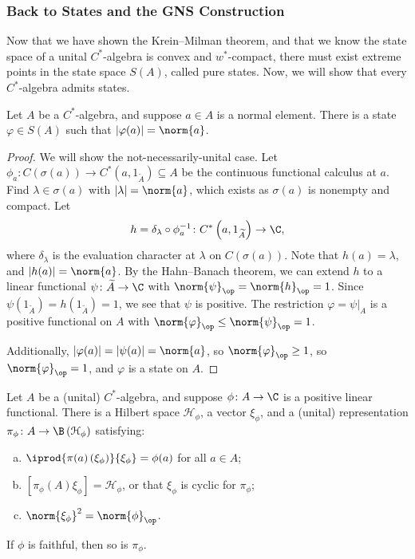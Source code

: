 \documentclass[10pt]{mypackage}
\begin{document}
\subsubsection{Back to States and the GNS Construction}%
Now that we have shown the Krein--Milman theorem, and that we know the state space of a unital $C^{\ast}$-algebra is convex and $w^{\ast}$-compact, there must exist extreme points in the state space $S(A)$, called pure states. Now, we will show that every $C^{\ast}$-algebra admits states.
\begin{proposition}
  Let $A$ be a $C^{\ast}$-algebra, and suppose $a\in A$ is a normal element. There is a state $\varphi\in S(A)$ such that $\left\vert \varphi(a) \right\vert = \norm{a}$.
\end{proposition}
\begin{proof}
  We will show the not-necessarily-unital case. Let $\phi_a\colon C\left(\sigma\left(a\right)\right)\rightarrow C^{\ast}\left(a,1_{\widetilde{A}}\right)\subseteq A$ be the continuous functional calculus at $a$. Find $\lambda\in \sigma(a)$ with $\left\vert \lambda \right\vert = \norm{a}$, which exists as $\sigma(a)$ is nonempty and compact. Let
  \begin{align*}
    h = \delta_{\lambda}\circ \phi_a^{-1}\colon C^{\ast}\left(a,1_{\widetilde{A}}\right) \rightarrow \C,
  \end{align*}
  where $\delta_{\lambda}$ is the evaluation character at $\lambda$ on $C\left(\sigma\left(a\right)\right)$. Note that $h(a) = \lambda$, and $\left\vert h(a) \right\vert = \norm{a}$. By the Hahn--Banach theorem, we can extend $h$ to a linear functional $\psi\colon \widetilde{A}\rightarrow \C$ with $\norm{\psi}_{\op} = \norm{h}_{\op} = 1$. Since $\psi\left(1_{\widetilde{A}}\right) = h\left(1_{\widetilde{A}}\right) = 1$, we see that $\psi$ is positive. The restriction $\varphi = \psi|_{A}$ is a positive functional on $A$ with $\norm{\varphi}_{\op} \leq \norm{\psi}_{\op} = 1$.\newline

  Additionally, $\left\vert \varphi(a) \right\vert = \left\vert \psi(a) \right\vert = \norm{a}$, so $\norm{\varphi}_{\op}\geq 1$, so $\norm{\varphi}_{\op} = 1$, and $\varphi$ is a state on $A$.
\end{proof}
\begin{theorem}
  Let $A$ be a (unital) $C^{\ast}$-algebra, and suppose $\phi\colon A\rightarrow \C$ is a positive linear functional. There is a Hilbert space $\mathcal{H}_{\phi}$, a vector $\xi_{\phi}$, and a (unital) representation $\pi_{\phi}\colon A\rightarrow \B\left(\mathcal{H}_{\phi}\right)$ satisfying:
  \begin{enumerate}[(a)]
    \item $ \iprod{\pi(a)\left(\xi_{\phi}\right)}{\xi_{\phi}} = \phi(a) $ for all $a\in A$;
    \item $\left[\pi_{\phi}(A)\xi_{\phi}\right] = \mathcal{H}_{\phi}$, or that $\xi_{\phi}$ is cyclic for $\pi_{\phi}$;
    \item $\norm{\xi_{\phi}}^2 = \norm{\phi}_{\op}$.
  \end{enumerate}
  If $\phi$ is faithful, then so is $\pi_{\phi}$.
\end{theorem}
\end{document}
